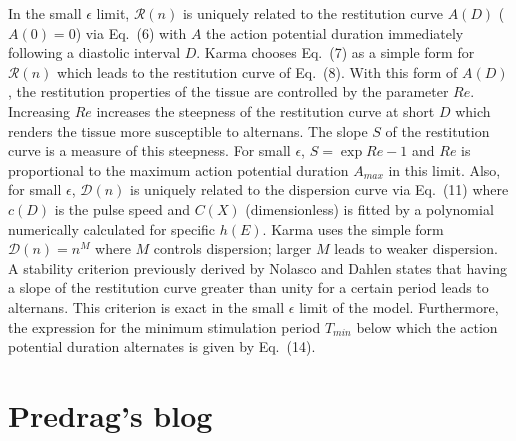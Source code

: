 In the small $\epsilon$ limit, $\mathcal{R}(n)$ is uniquely related
to the restitution curve $A(D)$ ($A(0)=0$) via Eq.~(6) with $A$ the
action potential duration immediately following a diastolic interval
$D$. Karma chooses Eq.~(7) as a simple form for $\mathcal{R}(n)$
which leads to the restitution curve of Eq.~(8). With this form of
$A(D)$, the restitution properties of the tissue are controlled by
the parameter $Re$. Increasing $Re$ increases the steepness of the
restitution curve at short $D$ which renders the tissue more
susceptible to alternans. The slope $S$ of the restitution curve is a
measure of this steepness. For small $\epsilon$, $S=\exp{Re}-1$ and
$Re$ is proportional to the maximum action potential duration
$A_{max}$ in this limit. Also, for small $\epsilon$, $\mathcal{D}(n)$
is uniquely related to the dispersion curve via Eq.~(11) where $c(D)$
is the pulse speed and $C(X)$ (dimensionless) is fitted by a
polynomial numerically calculated for specific $h(E)$. Karma uses the
simple form $\mathcal{D}(n)=n^M$ where $M$ controls dispersion;
larger $M$ leads to weaker dispersion. A stability criterion
previously derived by
Nolasco and Dahlen states that having a slope
of the restitution curve greater than unity for a certain period
leads to alternans. This criterion is exact in the small $\epsilon$
limit of the model. Furthermore, the expression for the minimum
stimulation period $T_{min}$ below which the action potential
duration alternates is given by Eq.~(14).






\newpage

\section{Predrag's blog}
\label{s:blogPC}

